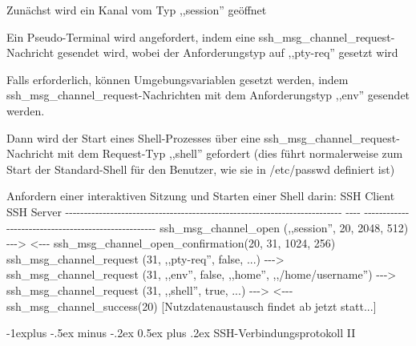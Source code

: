 \documentclass[a4paper]{article}
\makeatletter
\renewcommand{\subsection}{\@startsection{subsection}{2}{0mm}%
 {-1explus -.5ex minus -.2ex}%
 {0.5ex plus .2ex}%
 {\normalfont\normalsize\bfseries}}
\makeatother
\begin{document}
\begin{multicols}{3}
\begin{itemize*}
\begin{itemize*}
                  \begin{itemize*}
                        \item Zunächst wird ein Kanal vom Typ ,,session'' geöffnet
                        \item Ein Pseudo-Terminal wird angefordert, indem eine ssh\_msg\_channel\_request-Nachricht gesendet wird, wobei der Anforderungstyp auf ,,pty-req'' gesetzt wird
                        \item Falls erforderlich, können Umgebungsvariablen gesetzt werden, indem ssh\_msg\_channel\_request-Nachrichten mit dem Anforderungstyp ,,env'' gesendet werden.
                        \item Dann wird der Start eines Shell-Prozesses über eine ssh\_msg\_channel\_request-Nachricht mit dem Request-Typ ,,shell'' gefordert (dies führt normalerweise zum Start der Standard-Shell für den Benutzer, wie sie in /etc/passwd definiert ist)
                        \item Anfordern einer interaktiven Sitzung und Starten einer Shell darin: \textbar{} SSH Client \textbar{} \textbar{} SSH Server \textbar{} \textbar{} -\/-\/-\/-\/-\/-\/-\/-\/-\/-\/-\/-\/-\/-\/-\/-\/-\/-\/-\/-\/-\/-\/-\/-\/-\/-\/-\/-\/-\/-\/-\/-\/-\/-\/-\/-\/-\/-\/-\/-\/-\/-\/-\/-\/-\/-\/-\/-\/-\/-\/-\/-\/-\/-\/-\/-\/-\/-\/-\/-\/-\/-\/-\/-\/-\/-\/-\/-\/-\/-\/-\/-\/-\/- \textbar{} -\/-\/-\/- \textbar{} -\/-\/-\/-\/-\/-\/-\/-\/-\/-\/-\/-\/-\/-\/-\/-\/-\/-\/-\/-\/-\/-\/-\/-\/-\/-\/-\/-\/-\/-\/-\/-\/-\/-\/-\/-\/-\/-\/-\/-\/-\/-\/-\/-\/-\/-\/-\/-\/-\/-\/-\/- \textbar{} \textbar{} ssh\_msg\_channel\_open (,,session'', 20, 2048, 512) \textbar{} -\/-\/-\textgreater{} \textbar{} \textbar{} \textbar{} \textless-\/-\/- \textbar{} ssh\_msg\_channel\_open\_confirmation(20, 31, 1024, 256) \textbar{} \textbar{} ssh\_msg\_channel\_request (31, ,,pty-req'', false, ...) \textbar{} -\/-\/-\textgreater{} \textbar{} \textbar{} ssh\_msg\_channel\_request (31, ,,env'', false, ,,home'', ,,/home/username'') \textbar{} -\/-\/-\textgreater{} \textbar{} \textbar{} ssh\_msg\_channel\_request (31, ,,shell'', true, ...) \textbar{} -\/-\/-\textgreater{} \textbar{} \textbar{} \textbar{} \textless-\/-\/- \textbar{} ssh\_msg\_channel\_success(20) \textbar{}
                        {[}Nutzdatenaustausch findet ab jetzt statt...{]}
                  \end{itemize*}
            \end{itemize*}


            \subsection{SSH-Verbindungsprotokoll
                  II}


\end{itemize*}
\end{multicols}
\end{document}
